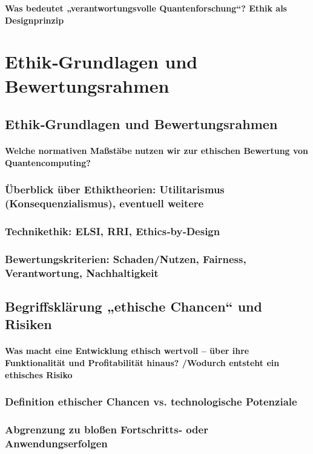 \textbf{Was bedeutet „verantwortungsvolle Quantenforschung“?
Ethik als Designprinzip}





\section{Ethik‑Grundlagen und Bewertungsrahmen}

\subsection{Ethik‑Grundlagen und Bewertungsrahmen}
\paragraph{Welche normativen Maßstäbe nutzen wir zur ethischen Bewertung von Quantencomputing?}

\subsubsection{Überblick über Ethiktheorien: Utilitarismus (Konsequenzialismus), eventuell weitere}
\subsubsection{Technikethik: ELSI, RRI, Ethics‑by‑Design}
\subsubsection{Bewertungskriterien: Schaden/Nutzen, Fairness, Verantwortung, Nachhaltigkeit}


\subsection{Begriffsklärung „ethische Chancen“ und Risiken}
\paragraph{Was macht eine Entwicklung ethisch wertvoll – über ihre Funktionalität und Profitabilität hinaus? /Wodurch entsteht ein ethisches Risiko}

\subsubsection{Definition ethischer Chancen vs. technologische Potenziale}
\subsubsection{Abgrenzung zu bloßen Fortschritts‑ oder Anwendungserfolgen}
